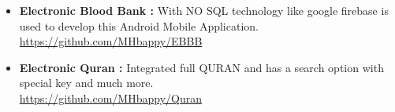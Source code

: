 \begin{cvparagraph}
\begin{itemize}
				
				\item \textbf{Electronic Blood Bank : } With NO SQL technology like google firebase is used to develop this Android Mobile Application.\\ \underline{https://github.com/MHbappy/EBBB}
				
				\item \textbf{Electronic Quran : } Integrated full QURAN  and has a search option with special key and much more.\\ \underline{https://github.com/MHbappy/Quran}
		
		
		
	\end{itemize}
\end{cvparagraph}

